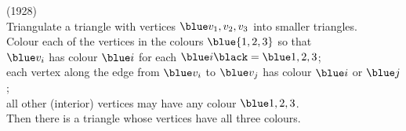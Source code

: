 \newcommand{\spernerlemma}{{\dg Sperner's Lemma} {\gray(1928)}
  \\Triangulate a triangle with vertices $\bl v_1,v_2,v_3$ into smaller triangles.
  \\Colour each of the vertices in the colours $\bl\{1,2,3\}$ so that
  \\\mybullet $\bl v_i$ has colour $\bl i$ for each $\bl i\meq 1,2,3$;
  \\\mybullet each vertex along the edge from $\bl v_i$ to $\bl v_j$ has colour $\bl i$ or $\bl j$;
  \\\mybullet all other (interior) vertices may have any colour $\bl 1,2,3$.
  \\Then there is a triangle whose vertices have all three colours.}

\newcommand{\spernerlemmaexa}{\example}
\newcommand{\spernerlemmaexb}{}

\newcommand{\spernerlemmapfa}{\\[2mm]\proof}
\newcommand{\spernerlemmapfb}{\\Let $\bl G$ be the graph with a vertex in each triangle, including the outer triangle,
  and edges that cross the triangle sides whose vertices are coloured $\bl 1$ and $\bl2$.}
\newcommand{\spernerlemmapfc}{\\{\gray (Then $\lightblue G$ is a subgraph of the dual graph of the triangulation.)}}
\newcommand{\spernerlemmapfd}{\\The number of edges crossing the triangle side $\bl v1$ from $\bl v_2$ is odd.}
\newcommand{\spernerlemmapfe}{\\Hence, the degree of the other vertex of $\bl G$ is odd.}
\newcommand{\spernerlemmapff}{\\The degree of each other vertex is 1 if it lies in a tricoloured triangle and is 2 otherwise.}
\newcommand{\spernerlemmapfg}{\\By the {\dg Handshaking Lemma}, the sum of vertex degrees is even}
\newcommand{\spernerlemmapfh}{\\so there must be an odd number of $\bl 1$-degree vertices.}
\newcommand{\spernerlemmapfj}{\\In particular, there is at least one such vertex.}
\newcommand{\spernerlemmapfk}{\\Hence, there is a tri-coloured triangle.\qed}

\np\spernerlemma


\newcommand{\brouwera}{{\dg Brouwer's Fixed Point Theorem} {\gray (1912)}
  \\Every continuous function $\bl f\,:\,B\to B$ on an $\bl n$-dimensional ball $\bl B\subseteq \mathbb{R}^n$
    has a fixed point $\bl x\myin B$ with $\bl f(x)\meq (x)$.}

